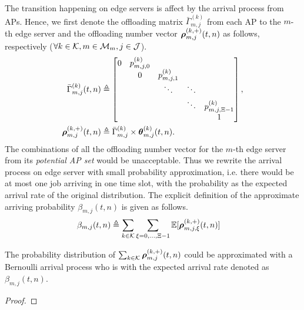 The transition happening on edge servers is affect by the arrival process from APs.
Hence, we first denote the offloading matrix $\bar{\Gamma}^{(k)}_{m,j}$ from each AP to the $m$-th edge server and the offloading number vector $\boldsymbol{\rho}^{(k,+)}_{m,j}({t,n})$ as follows, respectively ($\forall k\in\mathcal{K}, m\in\mathcal{M}_{m}, j\in\mathcal{J}$).
\begin{align}
    \bar{\Gamma}^{(k)}_{m,j}(t,n) &\triangleq
    \begin{bmatrix}
        0 & p^{(k)}_{m,j,0} &                 &        &                     \\
        & 0               & p^{(k)}_{m,j,1} &        &                     \\
        &                 & \ddots          & \ddots &                     \\
        &                 &                 & \ddots & p^{(k)}_{m,j,\Xi-1} \\
        &                 &                 &        & 1                   \\
    \end{bmatrix},
    \\
    \boldsymbol{\rho}^{(k,+)}_{m,j}({t,n}) &\triangleq \bar{\Gamma}^{(k)}_{m,j} \times \boldsymbol{\theta}^{(k)}_{m,j}({t,n}).
\end{align}
The combinations of all the offloading number vector for the $m$-th edge server from its \emph{potential AP set} would be unacceptable.
Thus we rewrite the arrival process on edge server with small probability approximation, i.e. there would be at most one job arriving in one time slot, with the probability as the expected arrival rate of the original distribution.
The explicit definition of the approximate arriving probability $\beta_{m,j}({t,n})$ is given as follows.
\begin{align}
    {\beta}_{m,j}({t,n}) &\triangleq \sum_{k\in\mathcal{K}} \sum_{\xi=0,\dots,\Xi-1} \mathbb{E}[\boldsymbol{\rho}^{(k,+)}_{m,j,\xi}({t,n})]
    \label{eqn_0}
\end{align}
\begin{lemma}
    The probability distribution of $\sum_{k\in\mathcal{K}} \boldsymbol{\rho}^{(k,+)}_{m,j}({t,n})$ could be approximated with a Bernoulli arrival process who is with the expected arrival rate denoted as ${\beta}_{m,j}({t,n})$.
\end{lemma}
\begin{proof}
\end{proof}


